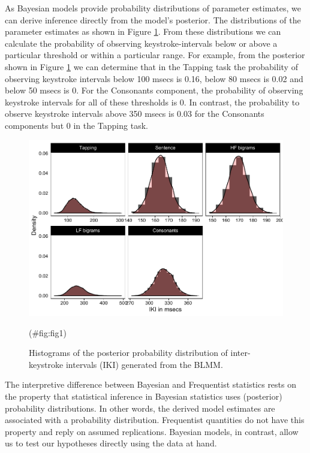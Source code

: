 \begin{appendix}
As Bayesian models provide probability distributions of parameter
estimates, we can derive inference directly from the model's posterior.
The distributions of the parameter estimates as shown in Figure
\ref{fig:blmm}. From these distributions we can calculate the
probability of observing keystroke-intervals below or above a particular
threshold or within a particular range. For example, from the posterior
shown in Figure \ref{fig:blmm} we can determine that in the Tapping task
the probability of observing keystroke intervals below 100 msecs is
0.16, below 80 msecs is 0.02 and below 50 msecs is 0. For the Consonants
component, the probability of observing keystroke intervals for all of
these thresholds is 0. In contrast, the probability to observe keystroke
intervals above 350 msecs is 0.03 for the Consonants components but 0 in
the Tapping task.

\begin{figure}[!h]

{\centering \includegraphics{ct_files/figure-latex/fig1-1} 

}

\caption{\label{fig:blmm}Histograms of the posterior probability distribution of inter-keystroke intervals (IKI) generated from the BLMM.}(\#fig:fig1)
\end{figure}

The interpretive difference between Bayesian and Frequentist statistics
rests on the property that statistical inference in Bayesian statistics
uses (posterior) probability distributions. In other words, the derived
model estimates are associated with a probability distribution.
Frequentist quantities do not have this property and reply on assumed
replications. Bayesian models, in contrast, allow us to test our
hypotheses directly using the data at hand.


\end{appendix}
